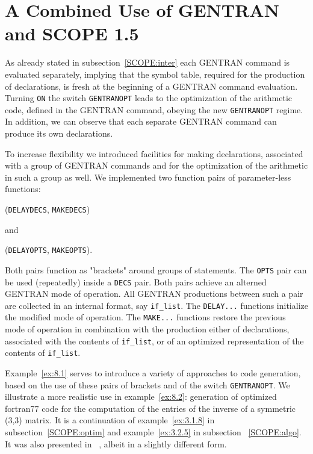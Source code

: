 \section{A Combined Use of GENTRAN and SCOPE 1.5}\label{SCOPE:gopt}

As already stated in subsection~\ref{SCOPE:inter} each GENTRAN command is
evaluated separately, implying that the symbol table, required
for the production of declarations, is fresh at the beginning of a GENTRAN
command evaluation. Turning {\tt ON} the switch {\tt GENTRANOPT} leads to
the optimization of the arithmetic code, defined in  the GENTRAN command,
obeying the new {\tt GENTRANOPT} regime. In addition, we can observe that
each separate GENTRAN command can produce its own declarations.

To increase flexibility we introduced facilities for making declarations,
associated with a group of GENTRAN commands and for the optimization of
the arithmetic in such a group as well.
We implemented two function pairs of parameter-less functions:

\hspace{1cm} ({\tt DELAYDECS}, {\tt MAKEDECS})

and

\hspace{1cm} ({\tt DELAYOPTS}, {\tt MAKEOPTS}).

Both pairs function as "brackets" around groups of statements. The {\tt OPTS}
pair can be used (repeatedly) inside a {\tt DECS} pair. Both pairs achieve
an alterned GENTRAN mode of operation. All GENTRAN productions between such
a pair are collected in an internal format, say {\tt if\_list}.
The {\tt DELAY...} functions initialize the modified mode of operation.
The {\tt MAKE...} functions restore the previous mode of operation in
combination with the production either of declarations, associated with the
contents of {\tt if\_list}, or of an optimized representation  of the
contents of {\tt if\_list}.

Example~\ref{ex:8.1} serves to introduce a variety of approaches to code
generation, based on the use of these pairs of brackets and of the
switch {\tt GENTRANOPT}. We illustrate a more realistic use in
example~\ref{ex:8.2}: generation of optimized fortran77 code for the
computation of the entries of the inverse of a symmetric (3,3) matrix.
It is a continuation of example~\ref{ex:3.1.8} in
subsection~\ref{SCOPE:optim} and example~\ref{ex:3.2.5} in
subsection ~\ref{SCOPE:algo}. It was also presented
in ~\cite{Gates:85}, albeit in a slightly different form.

